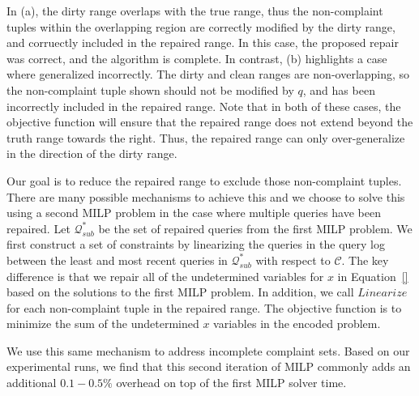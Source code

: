 In (a), the dirty range overlaps with the true range, thus the non-complaint tuples 
within the overlapping region are correctly modified by the dirty range, and corruectly included
in the repaired range.  In this case, the proposed repair was correct, and the algorithm is complete.
In contrast, (b) highlights a case where \sys generalized incorrectly.
The dirty and clean ranges are non-overlapping, so the non-complaint tuple shown should not 
be modified by $q$, and has been incorrectly included in the repaired range.
Note that in both of these cases, the objective function will ensure that the repaired range 
does not extend beyond the truth range towards the right.  Thus, the repaired range
can only over-generalize in the direction of the dirty range.

Our goal is to reduce the repaired range to exclude those non-complaint tuples.  
There are many possible mechanisms to achieve this and we choose to solve this using
a second MILP problem in the case where multiple queries have been repaired.
Let $\mathcal{Q}^*_{sub}$ be the set of repaired queries from the first MILP problem.
We first construct a set of constraints by linearizing the queries in the query log
between the least and most recent queries in $\mathcal{Q}^*_{sub}$ with respect to $\mathcal{C}$.
The key difference is that we repair all of the undetermined variables for $x$ in Equation~\ref{}
based on the solutions to the first MILP problem.  
In addition, we call $Linearize$ for each non-complaint tuple in the repaired range.
The objective function is to minimize the sum of the undetermined $x$ variables in the encoded
problem.

We use this same mechanism to address incomplete complaint sets.
Based on our experimental runs, we find that this second iteration of MILP 
commonly adds an additional $0.1-0.5\%$ overhead on top of the first MILP solver time.





